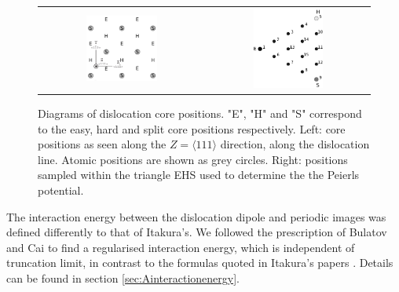 \documentclass[a4paper,11pt]{article}
\begin{document}
        \begin{figure}
    \begin{tabular}{cc}
	     \includegraphics[width=0.45\textwidth]{../Images/hardeasycoreatomdiagram_coord2.png} &
             \includegraphics[width=0.45\textwidth]{../Images/peierls_potential_positions_tbe.png}  \\
    \end{tabular}		
\caption{Diagrams of dislocation core positions. "E", "H" and "S" correspond to the easy, hard and split core positions respectively. Left: core positions as seen along the $Z=\langle 111 \rangle$ direction, along the dislocation line. Atomic positions are shown as grey circles. Right: positions sampled within the triangle EHS used to determine the the Peierls potential.  \label{sampledpositions}}
	\label{fig:peierlspot}
    \end{figure}


The interaction energy between the dislocation dipole and periodic images was defined differently
to that of Itakura's. We followed the prescription of Bulatov and Cai \cite{vasilybulatov2006} to
find a regularised interaction energy, which is independent of truncation limit, in contrast to
the formulas quoted in Itakura's papers \cite{Itakura2012}. Details can be found in section \ref{sec:Ainteractionenergy}.
\end{document}
